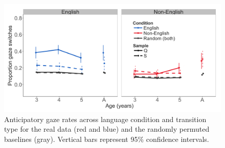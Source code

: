 \documentclass[authoryear, 12pt]{elsarticle}
\begin{document}
\begin{figure}[h]
\begin{center}
\includegraphics[width=1\textwidth]{figures/E1-samples-by-lang-groups-trans-types.png}
\end{center}
\caption{Anticipatory gaze rates across language condition and transition type for the real data (red and blue) and the randomly permuted baselines (gray). Vertical bars represent 95\% confidence intervals.} 
\label{fig:E1-randvsreal}
\end{figure}
\end{document}

